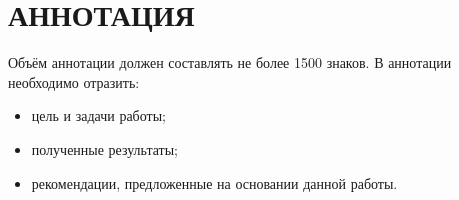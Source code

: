 \begingroup
  \par\vspace{3ex}
  \let\clearpage\relax
  \let\bfseries\relax
  \renewcommand{\hdngalign}{\centering} %
  \renewcommand{\hdngaligni}{}          %
  \chapter*{\uppercase{Аннотация}}
\endgroup

Объём аннотации должен составлять не более 1500 знаков.
В аннотации необходимо отразить:
\begin{itemize}
  \item цель и задачи работы;
  \item полученные результаты;
  \item рекомендации, предложенные на основании данной работы.
\end{itemize}

